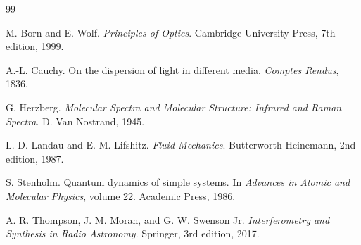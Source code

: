 \documentclass[11pt,twocolumn,a4paper]{article}
\theoremstyle{definition}
\begin{document}
\begin{thebibliography}{99}

 M. Born and E. Wolf. \emph{Principles of Optics}. Cambridge University Press, 7th edition, 1999.

 A.-L. Cauchy. On the dispersion of light in different media. \emph{Comptes Rendus}, 1836.

 G. Herzberg. \emph{Molecular Spectra and Molecular Structure: Infrared and Raman Spectra}. D. Van Nostrand, 1945.

 L. D. Landau and E. M. Lifshitz. \emph{Fluid Mechanics}. Butterworth-Heinemann, 2nd edition, 1987.

 S. Stenholm. Quantum dynamics of simple systems. In \emph{Advances in Atomic and Molecular Physics}, volume 22. Academic Press, 1986.

 A. R. Thompson, J. M. Moran, and G. W. Swenson Jr. \emph{Interferometry and Synthesis in Radio Astronomy}. Springer, 3rd edition, 2017.

\end{thebibliography}
\end{document}
